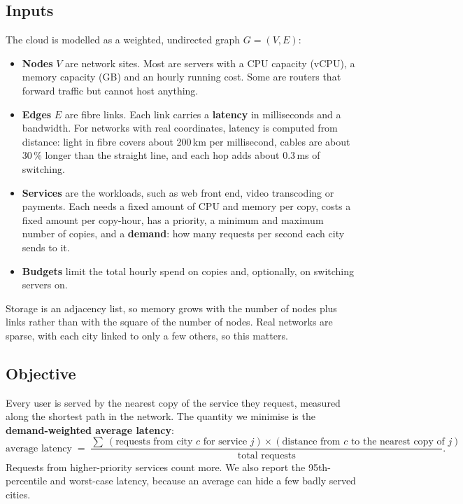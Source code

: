 \subsection{Inputs}
The cloud is modelled as a weighted, undirected graph $G=(V,E)$:
\begin{itemize}[leftmargin=*]
  \item \textbf{Nodes} $V$ are network sites. Most are servers with a CPU capacity (vCPU), a memory capacity (GB) and an hourly running cost. Some are routers that forward traffic but cannot host anything.
  \item \textbf{Edges} $E$ are fibre links. Each link carries a \textbf{latency} in milliseconds and a bandwidth. For networks with real coordinates, latency is computed from distance: light in fibre covers about 200\,km per millisecond, cables are about 30\,\% longer than the straight line, and each hop adds about 0.3\,ms of switching.
  \item \textbf{Services} are the workloads, such as web front end, video transcoding or payments. Each needs a fixed amount of CPU and memory per copy, costs a fixed amount per copy-hour, has a priority, a minimum and maximum number of copies, and a \textbf{demand}: how many requests per second each city sends to it.
  \item \textbf{Budgets} limit the total hourly spend on copies and, optionally, on switching servers on.
\end{itemize}
Storage is an adjacency list, so memory grows with the number of nodes plus links rather than with the square of the number of nodes. Real networks are sparse, with each city linked to only a few others, so this matters.

\subsection{Objective}
Every user is served by the nearest copy of the service they request, measured along the shortest path in the network. The quantity we minimise is the \textbf{demand-weighted average latency}:
\[
\text{average latency} \;=\; \frac{\sum\ (\text{requests from city } c \text{ for service } j)\times(\text{distance from } c \text{ to the nearest copy of } j)}{\text{total requests}}.
\]
Requests from higher-priority services count more. We also report the 95th-percentile and worst-case latency, because an average can hide a few badly served cities.

